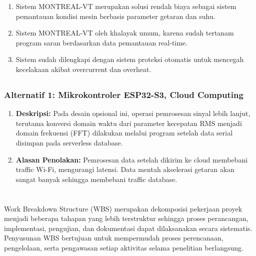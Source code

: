 \documentclass{elsinta}
\begin{document}
\begin{enumerate}
    \item Sistem MONTREAL-VT merupakan solusi rendah biaya sebagai sistem pemantauan kondisi mesin berbasis parameter getaran dan suhu.
    \item Sistem MONTREAL-VT oleh khalayak umum, karena sudah tertanam program saran berdasarkan data pemantauan real-time.
    \item Sistem sudah dilengkapi dengan sistem proteksi otomatis untuk mencegah kecelakaan akibat overcurrent dan overheat.
\end{enumerate}

\subsection{\AlternativeDesignTitle}

\subsubsection{\JustificationTitle}

\subsubsection*{Alternatif 1: Mikrokontroler ESP32-S3, Cloud Computing}
\begin{enumerate}
    \item \textbf{Deskripsi:} Pada desain opsional ini, operasi pemrosesan sinyal lebih lanjut, terutama
    konversi domain waktu dari parameter kecepatan RMS menjadi domain frekuensi (FFT) dilakukan
    melalui program setelah data serial disimpan pada serverless database.
    \item \textbf{Alasan Penolakan:} Pemrosesan data setelah dikirim ke cloud membebani traffic Wi-Fi, mengurangi latensi.
    Data mentah akselerasi getaran akan sangat banyak sehingga membebani traffic database.
\end{enumerate} 

\section{\ImplementationPlanTitle}

Work Breakdown Structure (WBS) merupakan dekomposisi pekerjaan proyek menjadi beberapa tahapan yang lebih terstruktur sehingga proses perancangan, implementasi, pengujian, dan dokumentasi dapat dilaksanakan secara sistematis. Penyusunan WBS bertujuan untuk mempermudah proses perencanaan, pengelolaan, serta pengawasan setiap aktivitas selama penelitian berlangsung.
\end{document}
